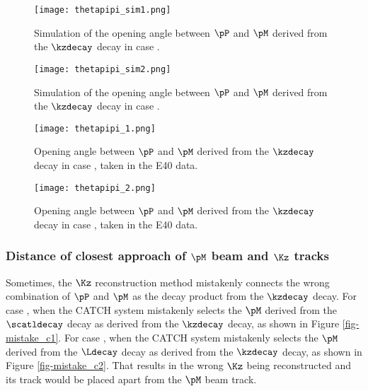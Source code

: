 \begin{figure}[!h]
  \begin{minipage}[t]{0.48\columnwidth}
    \centering
    \texttt{[image: thetapipi\_sim1.png]}
    \caption{Simulation of the opening angle between $\pP$ and $\pM$ derived from the $\kzdecay$ decay in case .}
    \label{fig-thetapipi_sim1}
  \end{minipage}
  \hspace{0.04\columnwidth} %
  \begin{minipage}[t]{0.48\columnwidth}
    \centering
    \texttt{[image: thetapipi\_sim2.png]}
    \caption{Simulation of the opening angle between $\pP$ and $\pM$ derived from the $\kzdecay$ decay in case .}
    \label{fig-thetapipi_sim2}
  \end{minipage}
\end{figure}

\begin{figure}[!h]
  \begin{minipage}[t]{0.48\columnwidth}
    \centering
    \texttt{[image: thetapipi\_1.png]}
    \caption{Opening angle between $\pP$ and $\pM$ derived from the $\kzdecay$ decay in case , taken in the E40 data.}
    \label{fig-thetapipi_1}
  \end{minipage}
  \hspace{0.04\columnwidth} %
  \begin{minipage}[t]{0.48\columnwidth}
    \centering
    \texttt{[image: thetapipi\_2.png]}
    \caption{Opening angle between $\pP$ and $\pM$ derived from the $\kzdecay$ decay in case , taken in the E40 data.}
    \label{fig-thetapipi_2}
  \end{minipage}
\end{figure}

\subsubsection{Distance of closest approach of $\pM$ beam and $\Kz$ tracks}
Sometimes, the $\Kz$ reconstruction method mistakenly connects the wrong combination of $\pP$ and $\pM$ as the decay product from the $\kzdecay$ decay. For case , when the CATCH system mistakenly selects the $\pM$ derived from the $\scatldecay$ decay as derived from the $\kzdecay$ decay, as shown in Figure \ref{fig-mistake_c1}. For case , when the CATCH system mistakenly selects the $\pM$ derived from the $\Ldecay$ decay as derived from the $\kzdecay$ decay, as shown in Figure \ref{fig-mistake_c2}. That results in the wrong $\Kz$ being reconstructed and its track would be placed apart from the $\pM$ beam track. 

